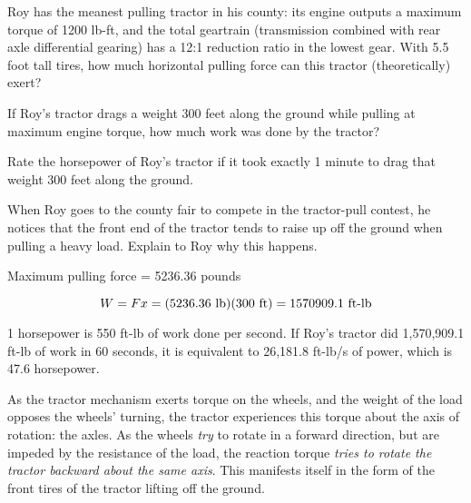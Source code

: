 

Roy has the meanest pulling tractor in his county: its engine outputs a maximum torque of 1200 lb-ft, and the total geartrain (transmission combined with rear axle differential gearing) has a 12:1 reduction ratio in the lowest gear.  With 5.5 foot tall tires, how much horizontal pulling force can this tractor (theoretically) exert?

\vskip 10pt

If Roy's tractor drags a weight 300 feet along the ground while pulling at maximum engine torque, how much work was done by the tractor?

\vskip 10pt

Rate the horsepower of Roy's tractor if it took exactly 1 minute to drag that weight 300 feet along the ground.

\vskip 10pt

When Roy goes to the county fair to compete in the tractor-pull contest, he notices that the front end of the tractor tends to raise up off the ground when pulling a heavy load.  Explain to Roy why this happens.







Maximum pulling force = 5236.36 pounds
 
\vskip 10pt

$$W = F x = (5236.36 \hbox{ lb}) (300 \hbox{ ft}) = 1570909.1 \hbox{ ft-lb}$$

\vskip 10pt

1 horsepower is 550 ft-lb of work done per second.  If Roy's tractor did 1,570,909.1 ft-lb of work in 60 seconds, it is equivalent to 26,181.8 ft-lb/s of power, which is 47.6 horsepower.

\vskip 10pt

As the tractor mechanism exerts torque on the wheels, and the weight of the load opposes the wheels' turning, the tractor experiences this torque about the axis of rotation: the axles.  As the wheels {\it try} to rotate in a forward direction, but are impeded by the resistance of the load, the reaction torque {\it tries to rotate the tractor backward about the same axis}.  This manifests itself in the form of the front tires of the tractor lifting off the ground.











